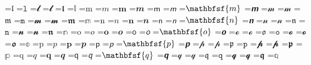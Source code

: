 \documentclass{article}
\begin{document}
=\hbox{$\mathfrak{l}$}
=\hbox{$\mathtt{l}$}
=\hbox{$\mathbfcal{l}$}
=\hbox{$\mathbfscr{l}$}
=\hbox{$\mathbffrak{l}$}
=\hbox{$\mathbb{l}$}
=\hbox{$\mathrm{m}$}
=\hbox{$\mathit{m}$}
=\hbox{$\mathbf{m}$}
=\hbox{$\mathbfit{m}$}
=\hbox{$\mathsf{m}$}
=\hbox{$\mathsfit{m}$}
=\hbox{$\mathbfsf{m}$}
=\hbox{$\mathbfsfit{m}$}
=\hbox{$\mathcal{m}$}
=\hbox{$\mathscr{m}$}
=\hbox{$\mathfrak{m}$}
=\hbox{$\mathtt{m}$}
=\hbox{$\mathbfcal{m}$}
=\hbox{$\mathbfscr{m}$}
=\hbox{$\mathbffrak{m}$}
=\hbox{$\mathbb{m}$}
=\hbox{$\mathrm{n}$}
=\hbox{$\mathit{n}$}
=\hbox{$\mathbf{n}$}
=\hbox{$\mathbfit{n}$}
=\hbox{$\mathsf{n}$}
=\hbox{$\mathsfit{n}$}
=\hbox{$\mathbfsf{n}$}
=\hbox{$\mathbfsfit{n}$}
=\hbox{$\mathcal{n}$}
=\hbox{$\mathscr{n}$}
=\hbox{$\mathfrak{n}$}
=\hbox{$\mathtt{n}$}
=\hbox{$\mathbfcal{n}$}
=\hbox{$\mathbfscr{n}$}
=\hbox{$\mathbffrak{n}$}
=\hbox{$\mathbb{n}$}
=\hbox{$\mathrm{o}$}
=\hbox{$\mathit{o}$}
=\hbox{$\mathbf{o}$}
=\hbox{$\mathbfit{o}$}
=\hbox{$\mathsf{o}$}
=\hbox{$\mathsfit{o}$}
=\hbox{$\mathbfsf{o}$}
=\hbox{$\mathbfsfit{o}$}
=\hbox{$\mathcal{o}$}
=\hbox{$\mathscr{o}$}
=\hbox{$\mathfrak{o}$}
=\hbox{$\mathtt{o}$}
=\hbox{$\mathbfcal{o}$}
=\hbox{$\mathbfscr{o}$}
=\hbox{$\mathbffrak{o}$}
=\hbox{$\mathbb{o}$}
=\hbox{$\mathrm{p}$}
=\hbox{$\mathit{p}$}
=\hbox{$\mathbf{p}$}
=\hbox{$\mathbfit{p}$}
=\hbox{$\mathsf{p}$}
=\hbox{$\mathsfit{p}$}
=\hbox{$\mathbfsf{p}$}
=\hbox{$\mathbfsfit{p}$}
=\hbox{$\mathcal{p}$}
=\hbox{$\mathscr{p}$}
=\hbox{$\mathfrak{p}$}
=\hbox{$\mathtt{p}$}
=\hbox{$\mathbfcal{p}$}
=\hbox{$\mathbfscr{p}$}
=\hbox{$\mathbffrak{p}$}
=\hbox{$\mathbb{p}$}
=\hbox{$\mathrm{q}$}
=\hbox{$\mathit{q}$}
=\hbox{$\mathbf{q}$}
=\hbox{$\mathbfit{q}$}
=\hbox{$\mathsf{q}$}
=\hbox{$\mathsfit{q}$}
=\hbox{$\mathbfsf{q}$}
=\hbox{$\mathbfsfit{q}$}
=\hbox{$\mathcal{q}$}
=\hbox{$\mathscr{q}$}
=\hbox{$\mathfrak{q}$}
=\hbox{$\mathtt{q}$}
=\hbox{$\mathbfcal{q}$}
=\hbox{$\mathbfscr{q}$}
=\hbox{$\mathbffrak{q}$}
=\hbox{$\mathbb{q}$}
\end{document}
